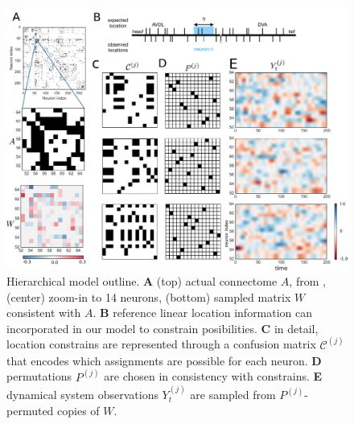 \documentclass{article}
\begin{document}
\begin{figure}[ht]
  \centering
  \includegraphics[width=5.0in]{Figure1.pdf} 
  \caption{Hierarchical model outline. \textbf{A} (top) actual connectome $A$, from \citep{varshney2011structural}, (center) zoom-in to 14 neurons, (bottom) sampled matrix $W$ consistent with $A$. \textbf{B} reference linear location information  \citep{white1986structure,wormatlas} can incorporated in our model to constrain posibilities. \textbf{C} in detail, location constrains are represented through a confusion matrix $\mathcal{C}^{(j) }$ that encodes which assignments are possible for each neuron. \textbf{D} permutations $P^{(j)}$ are chosen in consistency with constrains. \textbf{E} dynamical system observations $Y_t^{(j)}$ are sampled from $P^{(j)}$-permuted copies of $W$.}
\label{fig:1}
\end{figure}
\end{document}
